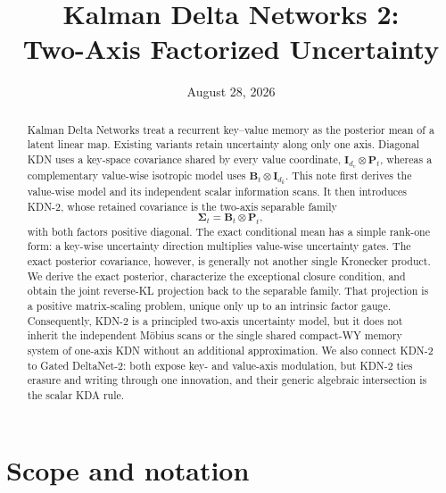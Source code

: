 \documentclass[11pt]{article}
\title{Kalman Delta Networks 2:\\
Two-Axis Factorized Uncertainty}
\author{}
\date{August 28, 2026}
\newcommand{\ve}[1]{\boldsymbol{#1}}
\begin{document}
\maketitle

\begin{abstract}
Kalman Delta Networks treat a recurrent key--value memory as the posterior mean of a latent
linear map.  Existing variants retain uncertainty along only one axis.  Diagonal KDN uses a
key-space covariance shared by every value coordinate,
$\ve{I}_{d_v}\otimes\ve{P}_t$, whereas a complementary value-wise isotropic model uses
$\ve{B}_t\otimes\ve{I}_{d_k}$.  This note first derives the value-wise model and its independent
scalar information scans.  It then introduces KDN-2, whose retained covariance is the
two-axis separable family
\[
  \ve{\Sigma}_t=\ve{B}_t\otimes\ve{P}_t,
\]
with both factors positive diagonal.  The exact conditional mean has a simple rank-one form: a
key-wise uncertainty direction multiplies value-wise uncertainty gates.  The exact posterior
covariance, however, is generally not another single Kronecker product.  We derive the exact
posterior, characterize the exceptional closure condition, and obtain the joint reverse-KL
projection back to the separable family.  That projection is a positive matrix-scaling problem,
unique only up to an intrinsic factor gauge.  Consequently, KDN-2 is a principled two-axis
uncertainty model, but it does not inherit the independent M\"obius scans or the single shared
compact-WY memory system of one-axis KDN without an additional approximation.  We also connect
KDN-2 to Gated DeltaNet-2: both expose key- and value-axis modulation, but KDN-2 ties erasure and
writing through one innovation, and their generic algebraic intersection is the scalar KDA rule.
\end{abstract}

\section{Scope and notation}
\label{sec:scope}
\end{document}
